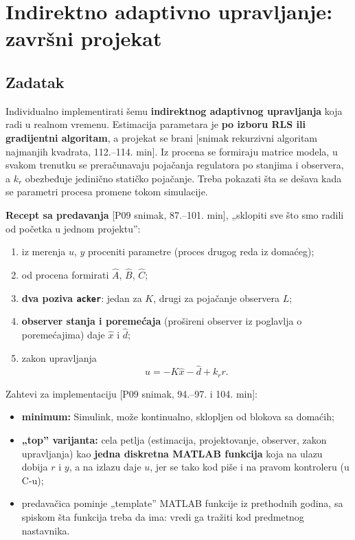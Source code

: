 \documentclass[11pt,a4paper,parskip=half,headsepline,numbers=noenddot]{scrartcl}
\DeclareRobustCommand{\izvor}[1]{{\small\color{izvorC}[#1]}}
\begin{document}
\section{Indirektno adaptivno upravljanje: završni projekat}

\subsection{Zadatak}

Individualno implementirati šemu \textbf{indirektnog adaptivnog upravljanja} koja radi u realnom vremenu. Estimacija parametara je \textbf{po izboru RLS ili gradijentni algoritam}, a projekat se brani \izvor{snimak rekurzivni algoritam najmanjih kvadrata, 112.--114. min}. Iz procena se formiraju matrice modela, u svakom trenutku se preračunavaju pojačanja regulatora po stanjima i observera, a \(k_r\) obezbeđuje jedinično statičko pojačanje. Treba pokazati šta se dešava kada se parametri procesa promene tokom simulacije.

\textbf{Recept sa predavanja} \izvor{P09 snimak, 87.--101. min}, „sklopiti sve što smo radili od početka u jednom projektu'':

\begin{enumerate}
\def\labelenumi{\arabic{enumi}.}
\item iz merenja \(u\), \(y\) proceniti parametre (proces drugog reda iz domaćeg);
\item od procena formirati \(\hat A\), \(\hat B\), \(\hat C\);
\item \textbf{dva poziva \texttt{acker}}: jedan za \(K\), drugi za pojačanje observera \(L\);
\item \textbf{observer stanja i poremećaja} (prošireni observer iz poglavlja o poremećajima) daje \(\hat x\) i \(\hat d\);
\item zakon upravljanja
  \[u = -K\hat x - \hat d + k_r r .\]
\end{enumerate}

Zahtevi za implementaciju \izvor{P09 snimak, 94.--97. i 104. min}:

\begin{itemize}
\item \textbf{minimum:} Simulink, može kontinualno, sklopljen od blokova sa domaćih;
\item \textbf{„top'' varijanta:} cela petlja (estimacija, projektovanje, observer, zakon upravljanja) kao \textbf{jedna diskretna MATLAB funkcija} koja na ulazu dobija \(r\) i \(y\), a na izlazu daje \(u\), jer se tako kod piše i na pravom kontroleru (u C-u);
\item predavačica pominje „template'' MATLAB funkcije iz prethodnih godina, sa spiskom šta funkcija treba da ima: vredi ga tražiti kod predmetnog nastavnika.
\end{itemize}
\end{document}
